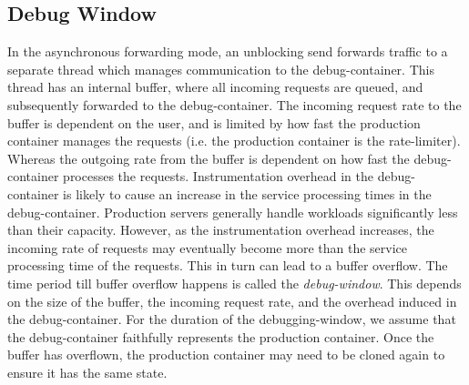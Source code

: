 
\subsection{Debug Window}
\label{sec:window}


In the asynchronous forwarding mode, an unblocking send forwards traffic to a separate thread which manages communication to the debug-container. 
This thread has an internal buffer, where all incoming requests are queued, and subsequently forwarded to the debug-container. 
The incoming request rate to the buffer is dependent on the user, and is limited by how fast the production container manages the requests (i.e. the production container is the rate-limiter).
Whereas the outgoing rate from the buffer is dependent on how fast the debug-container processes the requests.
Instrumentation overhead in the debug-container is likely to cause an increase in the service processing times in the debug-container.
Production servers generally handle workloads significantly less than their capacity. 
However, as the instrumentation overhead increases, the incoming rate of requests may eventually become more than the service processing time of the requests.
This in turn can lead to a buffer overflow. The time period till buffer overflow happens is called the \emph{debug-window}.
This depends on the size of the buffer, the incoming request rate, and the overhead induced in the debug-container. 
For the duration of the debugging-window, we assume that the debug-container faithfully represents the production container. 
Once the buffer has overflown, the production container may need to be cloned again to ensure it has the same state.


